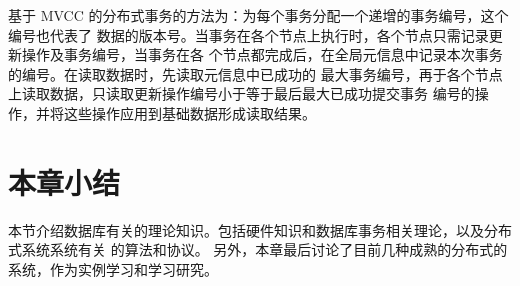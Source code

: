 基于 MVCC 的分布式事务的方法为：为每个事务分配一个递增的事务编号，这个编号也代表了
数据的版本号。当事务在各个节点上执行时，各个节点只需记录更新操作及事务编号，当事务在各
个节点都完成后，在全局元信息中记录本次事务的编号。在读取数据时，先读取元信息中已成功的
最大事务编号，再于各个节点上读取数据，只读取更新操作编号小于等于最后最大已成功提交事务
编号的操作，并将这些操作应用到基础数据形成读取结果。
\section{本章小结}
本节介绍数据库有关的理论知识。包括硬件知识和数据库事务相关理论，以及分布式系统系统有关
的算法和协议。
另外，本章最后讨论了目前几种成熟的分布式的系统，作为实例学习和学习研究。